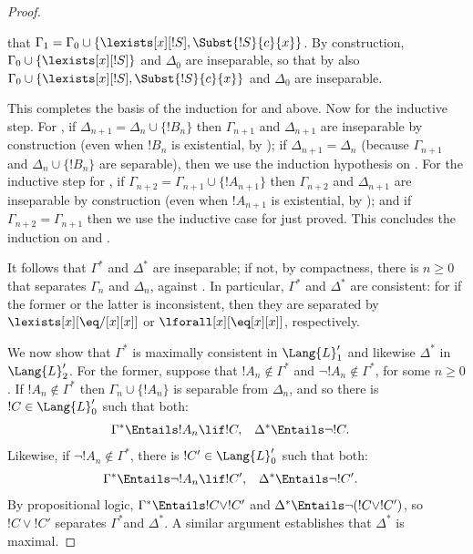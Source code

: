 \documentclass[../../../include/open-logic-section]{subfiles}
\begin{document}
\begin{proof}
\begin{enumerate}
  that $\Gamma_1 = \Gamma_0 \cup \{ \lexists[x][!S], \Subst{!S}{c}{x}
  \}$. By construction, $\Gamma_0 \cup \{ \lexists[x][!S]\}$ and
  $\Delta_0$ are inseparable, so that by  also
  $\Gamma_0 \cup \{ \lexists[x][!S], \Subst{!S}{c}{x} \}$ and
  $\Delta_0$ are inseparable.
\end{enumerate}
This completes the basis of the induction for  and
 above. Now for the inductive step. For , if
$\Delta_{n+1} = \Delta_n \cup \{ !B_n \}$ then $\Gamma_{n+1}$ and
$\Delta_{n+1}$ are inseparable by construction (even when $!B_n$ is
existential, by ); if $\Delta_{n+1} = \Delta_n$
(because $\Gamma_{n+1}$ and $\Delta_n \cup \{!B_n\}$ are separable),
then we use the induction hypothesis on . For the
inductive step for , if $\Gamma_{n+2} = \Gamma_{n+1} \cup
\{!A_{n+1} \}$ then $\Gamma_{n+2}$ and $\Delta_{n+1}$ are
inseparable by construction (even when $!A_{n+1}$ is existential,
by ); and if  $\Gamma_{n+2} = \Gamma_{n+1}$ then
we use the inductive case for  just proved. This
concludes the induction on  and . 

It follows that $\Gamma^*$ and $\Delta^*$ are inseparable; if not, by
compactness, there is $n \ge 0$ that separates $\Gamma_n$ and
$\Delta_n$, against . In particular, $\Gamma^*$ and
$\Delta^*$ are consistent: for if the former or the latter is
inconsistent, then they are separated by $\lexists[x][\eq/[x][x]]$ or
  $\lforall[x][\eq[x][x]]$, respectively.

We now show that $\Gamma^*$ is maximally consistent in
$\Lang{L}'_1$ and likewise $\Delta^*$ in $\Lang{L}'_2$. For the
former, suppose that $!A_n \notin \Gamma^*$ and $\lnot !A_n
\notin \Gamma^*$, for some $n \ge 0$. If $!A_n \notin \Gamma^*$
then $\Gamma_n \cup \{!A_n \}$ is separable from $\Delta_n$, and
so there is $!C \in \Lang{L}'_0$ such that both:
\begin{align*}
  \Gamma^* & \Entails !A_n \lif !C, & 
  \Delta^* & \Entails \lnot !C.
\end{align*}
Likewise, if $\lnot !A_n \notin \Gamma^*$, there is $!C' \in
\Lang{L}'_0$ such that both:
\begin{align*}
  \Gamma^* & \Entails \lnot !A_n \lif !C', & 
  \Delta^* & \Entails \lnot !C'.
\end{align*}
By propositional logic, $\Gamma^* \Entails !C \lor !C'$ and
$\Delta^* \Entails \lnot (!C \lor !C')$, so $!C \lor
!C'$ separates $\Gamma^*$and $\Delta^*$. A similar argument
establishes that $\Delta^*$ is maximal. 


\end{proof}
\end{document}
